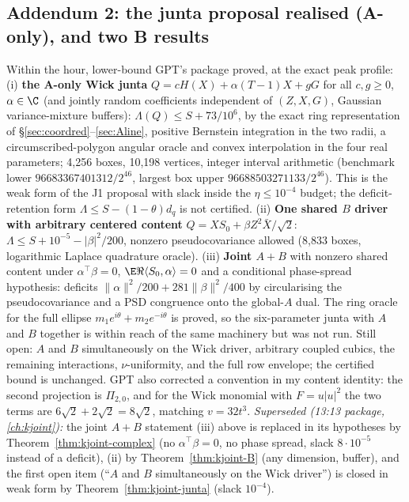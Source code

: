 \subsection{Addendum 2: the junta proposal realised (A-only), and two B results}
Within the hour, lower-bound GPT's package  proved, at the exact peak profile: (i) \textbf{the A-only Wick junta}
$Q=cH(X)+\alpha(T-1)X+gG$ for all $c,g\ge0$, $\alpha\in\C$ (and jointly random coefficients independent of $(Z,X,G)$, Gaussian variance-mixture buffers):
$\Lambda(Q)\le S+73/10^6$, by the exact ring representation of \S\ref{sec:coordred}--\ref{sec:Aline}, positive Bernstein integration in the two radii, a
circumscribed-polygon angular oracle and convex interpolation in the four real parameters; 4,256 boxes, 10,198 vertices, integer interval arithmetic (benchmark
lower $96683367401312/2^{46}$, largest box upper $96688503271133/2^{46}$). This is the weak form of the J1 proposal with slack inside the $\eta\le10^{-4}$ budget; the
deficit-retention form $\Lambda\le S-(1-\theta)d_q$ is not certified. (ii) \textbf{One shared $B$ driver with arbitrary centered content} $Q=XS_0+\beta Z^2\bar X/\sqrt2$:
$\Lambda\le S+10^{-5}-|\beta|^2/200$, nonzero pseudocovariance allowed (8,833 boxes, logarithmic Laplace quadrature oracle). (iii) \textbf{Joint $A+B$} with nonzero shared
content under $\alpha^{\top}\beta=0$, $\E\Re\langle S_0,\alpha\rangle=0$ and a conditional phase-spread hypothesis: deficits $\|\alpha\|^2/200+281\|\beta\|^2/400$ by circularising the
pseudocovariance and a PSD congruence onto the global-$A$ dual. The ring oracle for the full ellipse $m_1e^{i\theta}+m_2e^{-i\theta}$ is proved, so the six-parameter
junta with $A$ and $B$ together is within reach of the same machinery but was not run. Still open: $A$ and $B$ simultaneously on the Wick driver, arbitrary coupled
cubics, the remaining interactions, $\nu$-uniformity, and the full row envelope; the certified bound is unchanged. GPT also corrected a convention in my content
identity: the second projection is $\Pi_{2,0}$, and for the Wick monomial with $F=u|u|^2$ the two terms are $6\sqrt2+2\sqrt2=8\sqrt2$, matching $v=32t^3$.
\emph{Superseded (13:13 package, \autoref{ch:kjoint}):} the joint $A{+}B$ statement (iii) above is replaced in its hypotheses by Theorem~\ref{thm:kjoint-complex} (no $\alpha^{\top}\beta=0$, no phase spread, slack $8\cdot10^{-5}$ instead of a deficit), (ii) by Theorem~\ref{thm:kjoint-B} (any dimension, buffer), and the first open item (``$A$ and $B$ simultaneously on the Wick driver'') is closed in weak form by Theorem~\ref{thm:kjoint-junta} (slack $10^{-4}$).

